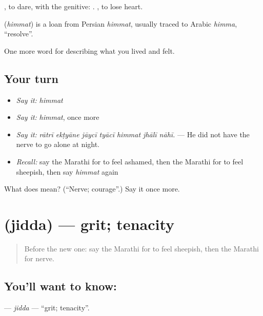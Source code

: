  , to dare, with the genitive:   .  , to lose heart.

\begin{cousinweb}
\textbf{} (\emph{himmat}) is a loan from Persian \emph{himmat}, usually traced to Arabic \emph{himma}, \textquotedblleft{}resolve\textquotedblright{}.
\end{cousinweb}

\begin{grammarlens}[title={What you've built}]
One more word for describing what you lived and felt.
\end{grammarlens}

\subsection*{Your turn}
\begin{itemize}
\raggedright
  \item \emph{Say it:} \emph{himmat}
  \item \emph{Say it:} \emph{himmat}, once more
  \item \emph{Say it:} \emph{rātrī ekṭyāne jāycī tyācī himmat jhālī nāhī.} — He did not have the nerve to go alone at night.
  \item \emph{Recall:} say the Marathi for to feel ashamed, then the Marathi for to feel sheepish, then say \emph{himmat} again
\end{itemize}

\begin{tcolorbox}[breakable,colback=teal!4,colframe=teal!35!black,title={Before you move on}]
What does  mean? (\textquotedblleft{}Nerve; courage\textquotedblright{}.) Say it once more.
\end{tcolorbox}
\section[\texorpdfstring{\mr{जिद्द} (jidda)}{जिद्द (jidda)}]{ (jidda) — grit; tenacity}

\label{lesson:MR-C464-jidda}



\begin{quote}
Before the new one: say the Marathi for to feel sheepish, then the Marathi for nerve.
\end{quote}

\subsection*{You'll want to know: }
\textbf{} — \emph{jidda} — \textquotedblleft{}grit; tenacity\textquotedblright{}.

